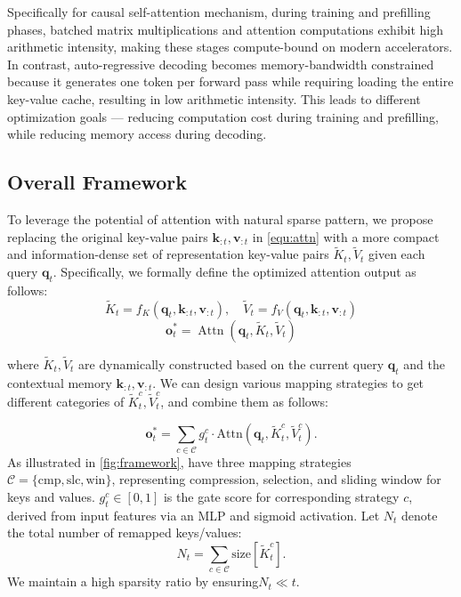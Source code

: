 Specifically for causal self-attention mechanism, during training and prefilling phases, batched matrix multiplications and attention computations exhibit high arithmetic intensity, making these stages compute-bound on modern accelerators. In contrast, auto-regressive decoding becomes memory-bandwidth constrained
because it generates one token per forward pass while requiring loading the entire key-value cache,
resulting in low arithmetic intensity. 
This leads to different optimization goals --- reducing computation cost during training and prefilling, while reducing memory access during decoding.


\subsection{Overall Framework}

To leverage the potential of attention with natural sparse pattern, we propose replacing the original key-value pairs \( \mathbf{k}_{:t}, \mathbf{v}_{:t} \) in \cref{equ:attn} with a more compact and information-dense set of representation key-value pairs $\tilde{K}_t, \tilde{V}_t$ given each query \( \mathbf{q}_t \).
Specifically, we formally define the optimized attention output as follows:
\begin{equation}
\tilde{K}_t = f_K(\mathbf{q}_t, \mathbf{k}_{:t}, \mathbf{v}_{:t}), \quad \tilde{V}_t = f_V(\mathbf{q}_t, \mathbf{k}_{:t}, \mathbf{v}_{:t})
\end{equation}
\begin{equation}
\mathbf{o}^*_t=\operatorname{Attn}\left(\mathbf{q}_t,\tilde{K}_t, \tilde{V}_t \right)
\end{equation}

 where 
 \( \tilde{K}_t, \tilde{V}_t \) are dynamically constructed based on the current query \( \mathbf{q}_t \) and the contextual memory \( \mathbf{k}_{:t}, \mathbf{v}_{:t} \). 
We can design various mapping strategies to get different categories of $\tilde{K}_t^c, \tilde{V}_t^c$, and combine them as follows:


\begin{equation}
\mathbf{o}^*_t = \sum_{c \in \mathcal{C}} g_t^c \cdot \text{Attn}(\mathbf{q}_t, \tilde{K}_t^c, \tilde{V}_t^c).
\label{equ:gate_merge}
\end{equation}
As illustrated in \cref{fig:framework}, \method{} have three mapping strategies $\mathcal{C}=\{\text{cmp},\text{slc},\text{win}\}$, representing compression, selection, and sliding window for keys and values.
$g_t^c\in [0, 1]$ is the gate score for corresponding strategy $c$, derived from input features via an MLP and sigmoid activation.
Let \( N_t \) denote the total number of remapped keys/values:
\begin{equation}
N_t = \sum_{c \in \mathcal{C}}\text{size}[\tilde{K}^c_t].
\end{equation}
We maintain a high sparsity ratio by ensuring${N_t}{} \ll t$.

